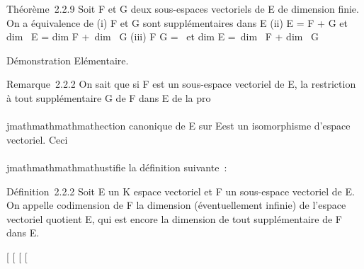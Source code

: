 Théorème~2.2.9 Soit F et G deux sous-espaces vectoriels de E de
dimension finie. On a équivalence de (i) F et G sont supplémentaires
dans E (ii) E = F + G et dim~ E
= dim F +\ dim~ G
(iii) F \bigcap G = \0\ et
dim E =\ dim~ F
+ dim~ G

Démonstration Elémentaire.

Remarque~2.2.2 On sait que si F est un sous-espace vectoriel de E, la
restriction à tout supplémentaire G de F dans E de la pro\\\\jmathmathmathmathection
canonique de E sur E\diagupF est un isomorphisme d'espace vectoriel. Ceci
\\\\jmathmathmathmathustifie la définition suivante~:

Définition~2.2.2 Soit E un K espace vectoriel et F un sous-espace
vectoriel de E. On appelle codimension de F la dimension (éventuellement
infinie) de l'espace vectoriel quotient E\diagupF, qui est encore la dimension
de tout supplémentaire de F dans E.

{[}
{[}
{[}
{[}
